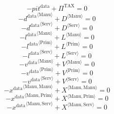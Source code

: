 \begin{equation}
-{p\!i\!t}^{\mathrm{data}} + \Pi^{\mathrm{TAX}} = 0
\end{equation}
\begin{equation}
-{d^{\mathrm{data}}}^{\langle \mathrm{\mathrm{Manu}}\rangle} + {D}^{\langle \mathrm{Manu}\rangle} = 0
\end{equation}
\begin{equation}
-{d^{\mathrm{data}}}^{\langle \mathrm{\mathrm{Serv}}\rangle} + {D}^{\langle \mathrm{Serv}\rangle} = 0
\end{equation}
\begin{equation}
-{l^{\mathrm{data}}}^{\langle \mathrm{\mathrm{Manu}}\rangle} + {L}^{\langle \mathrm{Manu}\rangle} = 0
\end{equation}
\begin{equation}
-{l^{\mathrm{data}}}^{\langle \mathrm{\mathrm{Prim}}\rangle} + {L}^{\langle \mathrm{Prim}\rangle} = 0
\end{equation}
\begin{equation}
-{l^{\mathrm{data}}}^{\langle \mathrm{\mathrm{Serv}}\rangle} + {L}^{\langle \mathrm{Serv}\rangle} = 0
\end{equation}
\begin{equation}
-{v^{\mathrm{data}}}^{\langle \mathrm{\mathrm{Manu}}\rangle} + {V}^{\langle \mathrm{Manu}\rangle} = 0
\end{equation}
\begin{equation}
-{v^{\mathrm{data}}}^{\langle \mathrm{\mathrm{Prim}}\rangle} + {V}^{\langle \mathrm{Prim}\rangle} = 0
\end{equation}
\begin{equation}
-{v^{\mathrm{data}}}^{\langle \mathrm{\mathrm{Serv}}\rangle} + {V}^{\langle \mathrm{Serv}\rangle} = 0
\end{equation}
\begin{equation}
-{x^{\mathrm{data}}}^{\langle \mathrm{\mathrm{Manu}},\mathrm{\mathrm{Manu}}\rangle} + {X}^{\langle \mathrm{Manu},\mathrm{Manu}\rangle} = 0
\end{equation}
\begin{equation}
-{x^{\mathrm{data}}}^{\langle \mathrm{\mathrm{Manu}},\mathrm{\mathrm{Prim}}\rangle} + {X}^{\langle \mathrm{Manu},\mathrm{Prim}\rangle} = 0
\end{equation}
\begin{equation}
-{x^{\mathrm{data}}}^{\langle \mathrm{\mathrm{Manu}},\mathrm{\mathrm{Serv}}\rangle} + {X}^{\langle \mathrm{Manu},\mathrm{Serv}\rangle} = 0
\end{equation}
